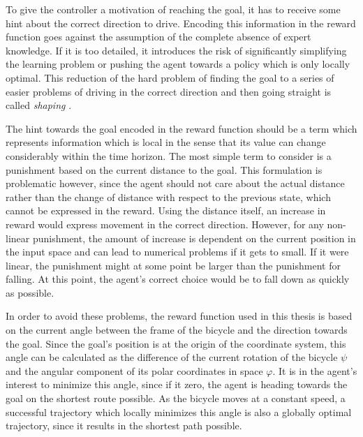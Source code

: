 To give the controller a motivation of reaching the goal, it has to receive some hint about the correct direction to drive.
Encoding this information in the reward function goes against the assumption of the complete absence of expert knowledge.
If it is too detailed, it introduces the risk of significantly simplifying the learning problem or pushing the agent towards a policy which is only locally optimal.
This reduction of the hard problem of finding the goal to a series of easier problems of driving in the correct direction and then going straight is called \emph{shaping} \cite{sutton_reinforcement_1998,randlov_learning_1998}.

The hint towards the goal encoded in the reward function should be a term which represents information which is local in the sense that its value can change considerably within the time horizon.
The most simple term to consider is a punishment based on the current distance to the goal.
This formulation is problematic however, since the agent should not care about the actual distance rather than the change of distance with respect to the previous state, which cannot be expressed in the reward.
Using the distance itself, an increase in reward would express movement in the correct direction.
However, for any non-linear punishment, the amount of increase is dependent on the current position in the input space and can lead to numerical problems if it gets to small.
If it were linear, the punishment might at some point be larger than the punishment for falling.
At this point, the agent's correct choice would be to fall down as quickly as possible.

In order to avoid these problems, the reward function used in this thesis is based on the current angle between the frame of the bicycle and the direction towards the goal.
Since the goal's position is at the origin of the coordinate system, this angle can be calculated as the difference of the current rotation of the bicycle $\psi$ and the angular component of its polar coordinates in space $\varphi$.
It is in the agent's interest to minimize this angle, since if it zero, the agent is heading towards the goal on the shortest route possible.
As the bicycle moves at a constant speed, a successful trajectory which locally minimizes this angle is also a globally optimal trajectory, since it results in the shortest path possible.


